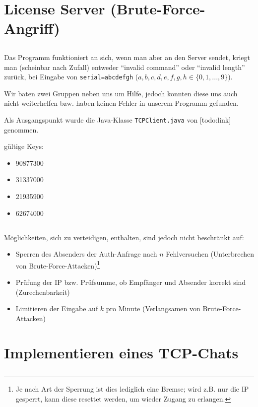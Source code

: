\documentclass[twoside]{article}
\newcommand{\say}[1]{%
	``#1''%
}
\newcommand{\ttt}[1]{%
	\texttt{#1}%
}
\begin{document}
\section{License Server (Brute-Force-Angriff)}
\subsection{}
Das Programm funktioniert an sich, wenn man aber an den Server sendet, kriegt man (scheinbar nach Zufall) entweder \say{invalid command} oder \say{invalid length} zurück, bei Eingabe von \ttt{serial=abcdefgh} ($a,b,c,d,e,f,g,h \in \{0,1,...,9\}$).

Wir baten zwei Gruppen neben uns um Hilfe, jedoch konnten diese uns auch nicht weiterhelfen bzw. haben keinen Fehler in unserem Programm gefunden.

Als Ausgangspunkt wurde die Java-Klasse \ttt{TCPClient.java} von [todo:link] genommen.

gültige Keys:
\begin{itemize}
	\item 90877300
	\item 31337000
	\item 21935900
	\item 62674000
\end{itemize}
\subsection{}
Möglichkeiten, sich zu verteidigen, enthalten, sind jedoch nicht beschränkt auf:
\begin{itemize}
	\item Sperren des Absenders der Auth-Anfrage nach $n$ Fehlversuchen (Unterbrechen von Brute-Force-Attacken)\footnote{Je nach Art der Sperrung ist dies lediglich eine Bremse; wird z.B. nur die IP gesperrt, kann diese resettet werden, um wieder Zugang zu erlangen.}
	\item Prüfung der IP bzw. Prüfsumme, ob Empfänger und Absender korrekt sind (Zurechenbarkeit)
	\item Limitieren der Eingabe auf $k$ pro Minute (Verlangsamen von Brute-Force-Attacken)
\end{itemize}
\subsection{}



\section{Implementieren eines TCP-Chats}
\subsection{}
\subsection{}
\subsection{}
\subsection{}
\subsection{}
\end{document}
